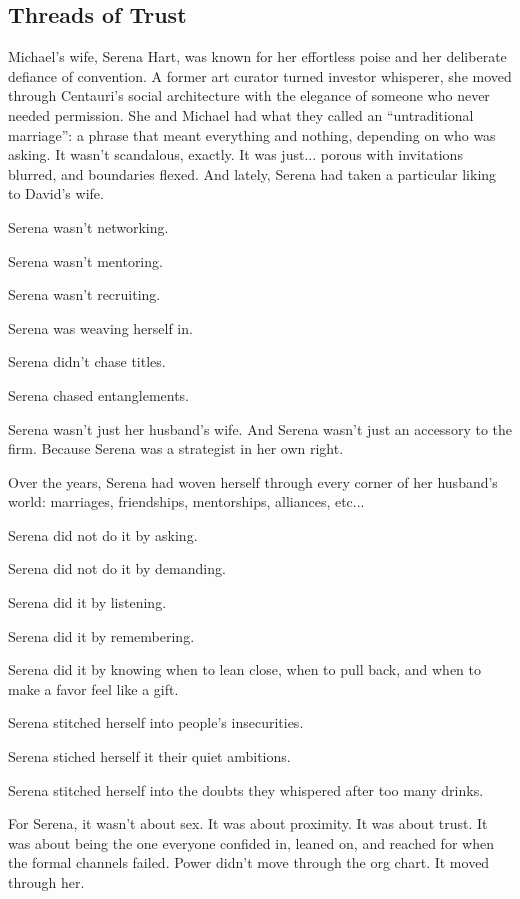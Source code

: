 \subsection{Threads of Trust}

Michael’s wife, Serena Hart, was known for her effortless poise and her deliberate defiance of convention. 
A former art curator turned investor whisperer, she moved through Centauri’s social architecture with the 
elegance of someone who never needed permission. She and Michael had what they called an ``untraditional 
marriage'': a phrase that meant everything and nothing, depending on who was asking. It wasn’t scandalous, 
exactly. It was just... porous with invitations blurred, and boundaries flexed. And lately, Serena had taken a 
particular liking to David’s wife.

Serena wasn’t networking.  

Serena wasn’t mentoring.  

Serena wasn’t recruiting.  

Serena was weaving herself in.

Serena didn’t chase titles. 

Serena chased entanglements.  

Serena wasn’t just her husband’s wife. 
And Serena wasn’t just an accessory to the firm.  
Because Serena was a strategist in her own right. 

Over the years, Serena had woven herself through every corner of her husband’s world:  
marriages, friendships, mentorships, alliances, etc...  

Serena did not do it by asking. 

Serena did not do it by demanding.  

Serena did it by listening. 

Serena did it by remembering. 

Serena did it by knowing when to lean close, when to pull back, and when to make a favor feel like a gift.

Serena stitched herself into people’s insecurities. 

Serena stiched herself it their quiet ambitions. 

Serena stitched herself into the doubts they whispered after too many drinks.  

For Serena, it wasn’t about sex.  
It was about proximity.  
It was about trust.  
It was about being the one everyone confided in, 
leaned on, and reached for when the formal channels failed.
Power didn’t move through the org chart.  
It moved through her.  

